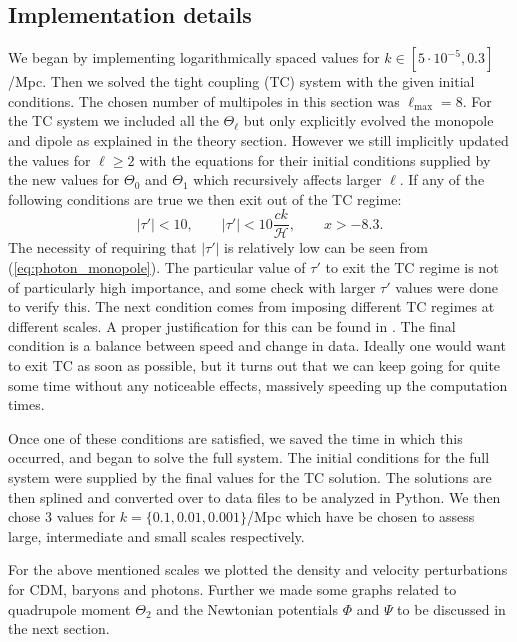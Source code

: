 \documentclass[%
reprint,
 amsmath,amssymb,
 aps,
]{revtex4-2}
\newcommand{\Hp}{\mathcal{H}}
\begin{document}
\subsection{Implementation details}
We began by implementing logarithmically spaced values for $k\in[5\cdot10^{-5},0.3]$/Mpc. Then we solved the tight coupling (TC) system with the given initial conditions. The chosen number of multipoles in this section was $\ell_\text{max}=8$. For the TC system we included all the $\Theta_\ell$ but only explicitly evolved the monopole and dipole as explained in the theory section. However we still implicitly updated the values for $\ell\geq2$ with the equations for their initial conditions supplied by the new values for $\Theta_0$ and $\Theta_1$ which recursively affects larger $\ell$. If any of the following conditions are true we then exit out of the TC regime:
\[|\tau'|<10,\quad\quad|\tau'|<10\frac{ck}{\Hp},\quad\quad x>-8.3.\]
 The necessity of requiring that $|\tau'|$ is relatively low can be seen from (\ref{eq:photon_monopole}). The particular value of $\tau'$ to exit the TC regime is not of particularly high importance, and some check with larger $\tau'$ values were done to verify this. The next condition comes from imposing different TC regimes at different scales. A proper justification for this can be found in \cite{Doran:2005ep}. The final condition is a balance between speed and change in data. Ideally one would want to exit TC as soon as possible, but it turns out that we can keep going for quite some time without any noticeable effects, massively speeding up the computation times. 
 
Once one of these conditions are satisfied, we saved the time in which this occurred, and began to solve the full system. The initial conditions for the full system were supplied by the final values for the TC solution. The solutions are then splined and converted over to data files to be analyzed in Python. We then chose 3 values for $k=\{0.1,0.01,0.001\}$/Mpc which have be chosen to assess large, intermediate and small scales respectively.
 
 For the above mentioned scales we plotted the density and velocity perturbations for CDM, baryons and photons. Further we made some graphs related to quadrupole moment $\Theta_2$ and the Newtonian potentials $\Phi$ and $\Psi$ to be discussed in the next section. 
\end{document}
